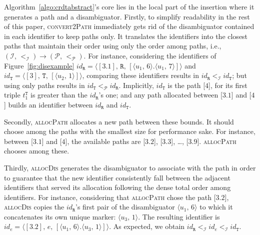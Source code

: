 \noindent Algorithm~\ref{algo:crdtabstract}'s core lies in the local part of the
insertion where it generates a path and a disambiguator. Firstly, to simplify
readability in the rest of this paper, \textsc{convert2Path} immediately gets
rid of the disambiguator contained in each identifier to keep paths only.
It translates the identifiers into the closest paths that maintain their order
using only the order among paths, i.e.,
$(\mathcal{I},\, <_\mathcal{I}) \rightarrow (\mathcal{P},\, <_{\mathcal{P}})$.
For instance, considering the identifiers of Figure~\ref{fig:disexample}
$id_\texttt{R} = \langle [3.1],\, \texttt{R}, \, [\langle u_1,\,6
\rangle.\langle u_1,\,7 \rangle] \rangle$
and
$id_\texttt{T} = \langle [3],\, \texttt{T}, \, [\langle u_2,\,1 \rangle]
\rangle$,
comparing these identifiers results in
$id_\texttt{R}<_\mathcal{I} id_\texttt{T}$; but using only paths results in
$id_\texttt{T} <_\mathcal{P} id_\texttt{R}$. Implicitly, $id_\texttt{T}$ is the
path [$4$], for its first triple $t_1^{\texttt{T}}$ is greater than the
$id_\texttt{R}$'s one; and any path allocated between [$3.1$] and [$4$] builds
an identifier between $id_\texttt{R}$ and $id_\texttt{T}$.



\noindent Secondly, \textsc{allocPath} allocates a new path between these
bounds. It should choose among the paths with the smallest size for performance
sake. For instance, between [$3.1$] and [$4$], the available paths are [$3.2$],
[$3.3$], \ldots, [$3.9$]. \textsc{allocPath} chooses among these.


\noindent Thirdly, \textsc{allocDis} generates the disambiguator to associate
with the path in order to guarantee that the new identifier consistently fall
between the adjacent identifiers that served its allocation following the dense
total order among identifiers. For instance, considering that \textsc{allocPath}
chose the path [$3.2$], \textsc{allocDis} copies the $id_\texttt{R}$'s first
pair of the disambiguator $\langle u_1,\,6 \rangle$ to which it concatenates its
own unique marker: $\langle u_3,\,1 \rangle$. The resulting identifier is
$id_e = \langle [3.2],\, e, \, [\langle u_1,\,6 \rangle .\langle u_3,\, 1\rangle ]
\rangle$.
As expected, we obtain
$id_\texttt{R} <_\mathcal{I} id_{e} <_\mathcal{I} id_\texttt{T}$.

